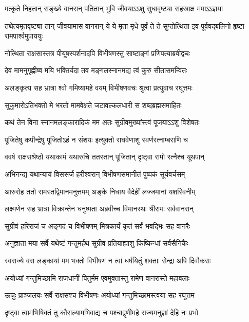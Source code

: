 \twolineshloka
{मत्कृते निहतान् सङ्ख्ये वानरान् पतितान् भुवि}
{जीवयाऽऽशु सुधावृष्ट्या सहस्राक्ष ममाऽऽज्ञया} %

\threelineshloka
{तथेत्यमृतवृष्ट्या तान् जीवयामास वानरान्}
{ये ये मृता मृधे पूर्वं ते ते सुप्तोत्थिता इव}
{पूर्ववद्बलिनो हृष्टा रामपार्श्वमुपाययुः} %

\twolineshloka
{नोत्थिता राक्षसास्तत्र पीयूषस्पर्शनादपि}
{विभीषणस्तु साष्टाङ्गं प्रणिपत्याब्रवीद्वचः} %

\twolineshloka
{देव मामनुगृह्णीष्व मयि भक्तिर्यदा तव}
{मङ्गलस्नानमद्य त्वं कुरु सीतासमन्वितः} %

\twolineshloka
{अलङ्कृत्य सह भ्रात्रा श्वो गमिष्यामहे वयम्}
{विभीषणवचः श्रुत्वा प्रत्युवाच रघूत्तमः} %

\twolineshloka
{सुकुमारोऽतिभक्तो मे भरतो मामवेक्षते}
{जटावल्कलधारी स शब्दब्रह्मसमाहितः} %

\twolineshloka
{कथं तेन विना स्नानमलङ्कारादिकं मम}
{अतः सुग्रीवमुख्यांस्त्वं पूजयाऽऽशु विशेषतः} %

\twolineshloka
{पूजितेषु कपीन्द्रेषु पूजितोऽहं न संशयः}
{इत्युक्तो राघवेणाशु स्वर्णरत्नाम्बराणि च} %

\twolineshloka
{ववर्ष राक्षसश्रेष्ठो यथाकामं यथारुचि}
{ततस्तान् पूजितान् दृष्ट्वा रामो रत्नैश्च यूथपान्} %

\twolineshloka
{अभिनन्द्य यथान्यायं विससर्ज हरीश्वरान्}
{विभीषणसमानीतं पुष्पकं सूर्यवर्चसम्} %

\twolineshloka
{आरुरोह ततो रामस्तद्विमानमनुत्तमम्}
{अङ्के निधाय वैदेहीं लज्जमानां यशस्विनीम्} %

\twolineshloka
{लक्ष्मणेन सह भ्रात्रा विक्रान्तेन धनुष्मता}
{अब्रवीच्च विमानस्थः श्रीरामः सर्ववानरान्} %

\twolineshloka
{सुग्रीवं हरिराजं च अङ्गदं च विभीषणम्}
{मित्रकार्यं कृतं सर्वं भवद्भिः सह वानरैः} %

\twolineshloka
{अनुज्ञाता मया सर्वे यथेष्टं गन्तुमर्हथ}
{सुग्रीव प्रतियाह्याशु किष्किन्धां सर्वसैनिकैः} %

\twolineshloka
{स्वराज्ये वस लङ्कायां मम भक्तो विभीषण}
{न त्वां धर्षयितुं शक्ताः सेन्द्रा अपि दिवौकसः} %

\twolineshloka
{अयोध्यां गन्तुमिच्छामि राजधानीं पितुर्मम}
{एवमुक्तास्तु रामेण वानरास्ते महाबलाः} %

\twolineshloka
{ऊचुः प्राञ्जलयः सर्वे राक्षसश्च विभीषणः}
{अयोध्यां गन्तुमिच्छामस्त्वया सह रघूत्तम} %

\twolineshloka
{दृष्ट्वा त्वामभिषिक्तं तु कौसल्यामभिवाद्य च}
{पश्चाद्वृणीमहे राज्यमनुज्ञां देहि नः प्रभो} %

